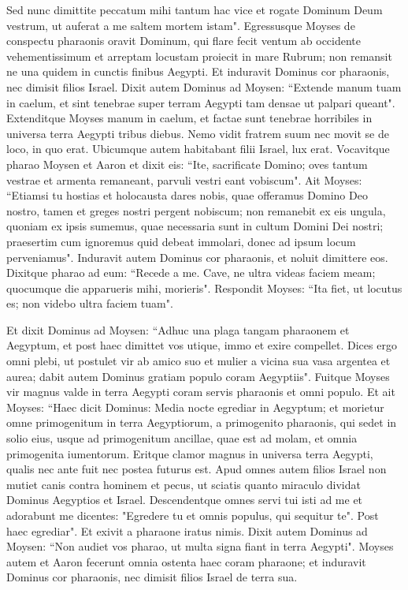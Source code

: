 \begin{biblechapter}
\verse Sed nunc dimittite peccatum mihi tantum hac vice et rogate Dominum Deum vestrum, ut auferat a me saltem mortem istam". 
\verse Egressusque Moyses de conspectu pharaonis oravit Dominum, 
\verse qui flare fecit ventum ab occidente vehementissimum et arreptam locustam proiecit in mare Rubrum; non remansit ne una quidem in cunctis finibus Aegypti. 
\verse Et induravit Dominus cor pharaonis, nec dimisit filios Israel. 
\verse Dixit autem Dominus ad Moysen: “Extende manum tuam in caelum, et sint tenebrae super terram Aegypti tam densae ut palpari queant". 
\verse Extenditque Moyses manum in caelum, et factae sunt tenebrae horribiles in universa terra Aegypti tribus diebus. 
\verse Nemo vidit fratrem suum nec movit se de loco, in quo erat. Ubicumque autem habitabant filii Israel, lux erat. 
\verse Vocavitque pharao Moysen et Aaron et dixit eis: “Ite, sacrificate Domino; oves tantum vestrae et armenta remaneant, parvuli vestri eant vobiscum". 
\verse Ait Moyses: “Etiamsi tu hostias et holocausta dares nobis, quae offeramus Domino Deo nostro, 
\verse tamen et greges nostri pergent nobiscum; non remanebit ex eis ungula, quoniam ex ipsis sumemus, quae necessaria sunt in cultum Domini Dei nostri; praesertim cum ignoremus quid debeat immolari, donec ad ipsum locum perveniamus". 
\verse Induravit autem Dominus cor pharaonis, et noluit dimittere eos. 
\verse Dixitque pharao ad eum: “Recede a me. Cave, ne ultra videas faciem meam; quocumque die apparueris mihi, morieris". 
\verse Respondit Moyses: “Ita fiet, ut locutus es; non videbo ultra faciem tuam". 
\end{biblechapter}

\begin{biblechapter}  
\verse Et dixit Dominus ad Moysen: “Adhuc una plaga tangam pharaonem et Aegyptum, et post haec dimittet vos utique, immo et exire compellet. 
\verse Dices ergo omni plebi, ut postulet vir ab amico suo et mulier a vicina sua vasa argentea et aurea; 
\verse dabit autem Dominus gratiam populo coram Aegyptiis". Fuitque Moyses vir magnus valde in terra Aegypti coram servis pharaonis et omni populo. 
\verse Et ait Moyses: “Haec dicit Dominus: Media nocte egrediar in Aegyptum; 
\verse et morietur omne primogenitum in terra Aegyptiorum, a primogenito pharaonis, qui sedet in solio eius, usque ad primogenitum ancillae, quae est ad molam, et omnia primogenita iumentorum. 
\verse Eritque clamor magnus in universa terra Aegypti, qualis nec ante fuit nec postea futurus est. 
\verse Apud omnes autem filios Israel non mutiet canis contra hominem et pecus, ut sciatis quanto miraculo dividat Dominus Aegyptios et Israel. 
\verse Descendentque omnes servi tui isti ad me et adorabunt me dicentes: "Egredere tu et omnis populus, qui sequitur te". Post haec egrediar". Et exivit a pharaone iratus nimis. 
\verse Dixit autem Dominus ad Moysen: “Non audiet vos pharao, ut multa signa fiant in terra Aegypti". 
\verse Moyses autem et Aaron fecerunt omnia ostenta haec coram pharaone; et induravit Dominus cor pharaonis, nec dimisit filios Israel de terra sua. 
\end{biblechapter}

